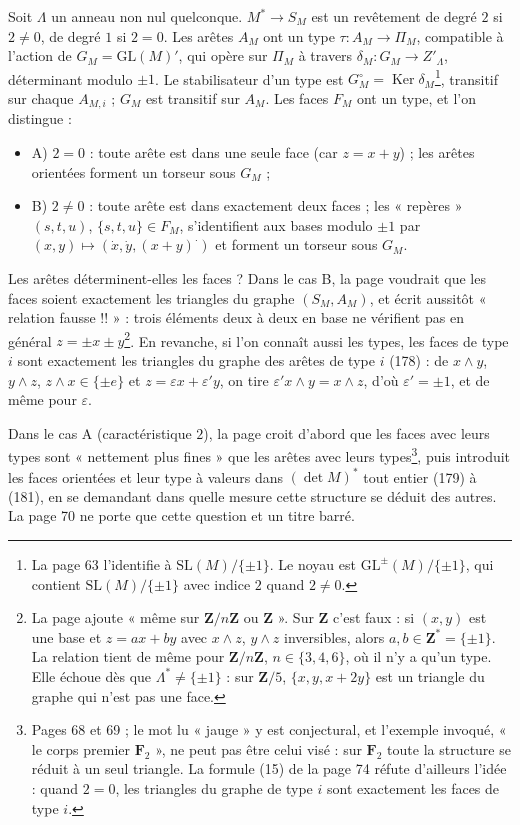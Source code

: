 \documentclass[11pt,a4paper]{article}
\begin{document}
Soit $\Lambda$ un anneau non nul quelconque. $M^{*} \to S_M$ est un revêtement
de degré $2$ si $2 \neq 0$, de degré $1$ si $2 = 0$. Les arêtes $A_M$ ont un
type $\tau : A_M \to \Pi_M$, compatible à l'action de $G_M = \mathrm{GL}(M)'$,
qui opère sur $\Pi_M$ à travers $\delta_M : G_M \to Z'_\Lambda$, déterminant
modulo $\pm 1$. Le stabilisateur d'un type est
$G^{\circ}_M = \operatorname{Ker} \delta_M$\footnote{La page 63 l'identifie à
$\mathrm{SL}(M)/\{\pm 1\}$. Le noyau est $\mathrm{GL}^{\pm}(M)/\{\pm 1\}$, qui
contient $\mathrm{SL}(M)/\{\pm 1\}$ avec indice $2$ quand $2 \neq 0$.}, transitif
sur chaque $A_{M,i}$ ; $G_M$ est transitif sur $A_M$. Les faces $F_M$ ont un
type, et l'on distingue :
\begin{itemize}
  \item A) $2 = 0$ : toute arête est dans une seule face (car $z = x + y$) ;
    les arêtes orientées forment un torseur sous $G_M$ ;
  \item B) $2 \neq 0$ : toute arête est dans exactement deux faces ; les
    « repères » $(s, t, u)$, $\{s, t, u\} \in F_M$, s'identifient aux bases
    modulo $\pm 1$ par $(x, y) \mapsto (\dot x, \dot y, (x+y)^{\cdot})$ et
    forment un torseur sous $G_M$.
\end{itemize}

Les arêtes déterminent-elles les faces ? Dans le cas B, la page voudrait que
les faces soient exactement les triangles du graphe $(S_M, A_M)$, et écrit
aussitôt « relation fausse !! » : trois éléments deux à deux en base ne
vérifient pas en général $z = \pm x \pm y$\footnote{La page ajoute « même sur
$\mathbf{Z}/n\mathbf{Z}$ ou $\mathbf{Z}$ ». Sur $\mathbf{Z}$ c'est faux : si
$(x, y)$ est une base et $z = ax + by$ avec $x \wedge z$, $y \wedge z$
inversibles, alors $a, b \in \mathbf{Z}^{*} = \{\pm 1\}$. La relation tient de
même pour $\mathbf{Z}/n\mathbf{Z}$, $n \in \{3, 4, 6\}$, où il n'y a qu'un type.
Elle échoue dès que $\Lambda^{*} \neq \{\pm 1\}$ : sur $\mathbf{Z}/5$, $\{x, y,
x + 2y\}$ est un triangle du graphe qui n'est pas une face.}. En revanche, si
l'on connaît aussi les types, les faces de type $i$ sont exactement les
triangles du graphe des arêtes de type $i$ (178) : de $x \wedge y$, $y \wedge
z$, $z \wedge x \in \{\pm e\}$ et $z = \varepsilon x + \varepsilon' y$, on tire
$\varepsilon' x \wedge y = x \wedge z$, d'où $\varepsilon' = \pm 1$, et de même
pour $\varepsilon$.

Dans le cas A (caractéristique $2$), la page croit d'abord que les faces avec
leurs types sont « nettement plus fines » que les arêtes avec leurs
types\footnote{Pages 68 et 69 ; le mot lu « jauge » y est conjectural, et
l'exemple invoqué, « le corps premier $\mathbf{F}_2$ », ne peut pas être celui
visé : sur $\mathbf{F}_2$ toute la structure se réduit à un seul triangle. La
formule (15) de la page 74 réfute d'ailleurs l'idée : quand $2 = 0$, les
triangles du graphe de type $i$ sont exactement les faces de type $i$.}, puis
introduit les faces orientées et leur type à valeurs dans $(\det M)^{*}$ tout
entier (179) à (181), en se demandant dans quelle mesure cette structure se
déduit des autres. La page 70 ne porte que cette question et un titre barré.
\end{document}
